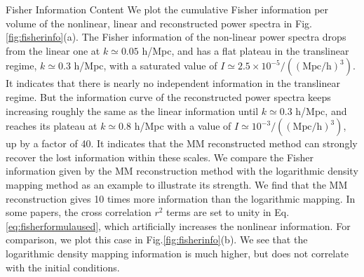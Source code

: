 \begin{section}{Fisher Information Content}
  We plot the cumulative Fisher information per volume of the
  nonlinear, linear and reconstructed power spectra in
  Fig. \ref{fig:fisherinfo}(a). The Fisher information of the
  non-linear power spectra drops from the linear one at
  $k \simeq 0.05$ h/Mpc, and has a flat plateau in the translinear
  regime, $k\simeq 0.3$ h/Mpc, with a saturated value of
  $I \simeq 2.5 \times 10^{-5}/(\mathrm{(Mpc/h)}^3)$.  It indicates
  that there is nearly no independent information in the translinear
  regime.  But the information curve of the reconstructed power
  spectra keeps increasing roughly the same as the linear information
  until $k\simeq 0.3$ h/Mpc, and reaches its plateau at $k\simeq 0.8$
  h/Mpc with a value of $I \simeq 10^{-3}/(\mathrm{(Mpc/h)}^3)$, up by
  a factor of 40.  It indicates that the MM reconstructed method can
  strongly recover the lost information within these scales.  We
  compare the Fisher information given by the MM reconstruction method
  with the logarithmic density mapping method \cite{bib:Mark2009} as
  an example to illustrate its strength.  We find that the MM
  reconstruction gives 10 times more information than the logarithmic
  mapping.  In some papers, the cross correlation $r^2$ terms are set
  to unity in Eq. \ref{eq:fisherformulaused}, which artificially
  increases the nonlinear information.  For comparison, we plot this
  case in Fig.\ref{fig:fisherinfo}(b).  We see that the logarithmic
  density mapping information is much higher, but does not correlate
  with the initial conditions.


\end{section}
